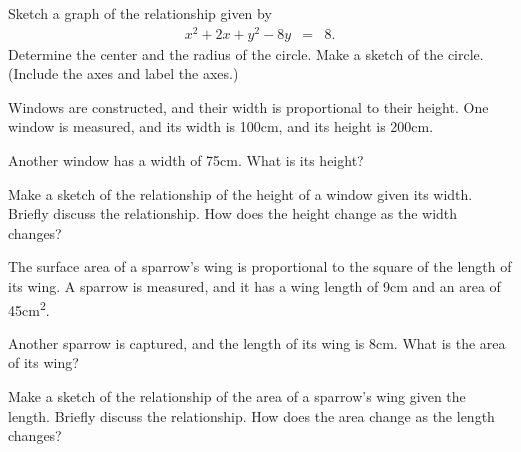 \begin{problem}
  \clearpage

\item Sketch a graph of the relationship given by
  \begin{eqnarray*}
    x^2 + 2x + y^2 - 8y & = & 8.
  \end{eqnarray*}
  Determine the center and the radius of the circle.  Make a sketch of
  the circle. (Include the axes and label the axes.)  

  \vfill

  \clearpage

\item Windows are constructed, and their width is proportional to
  their height. One window is measured, and its width is 100cm, and its
  height is 200cm. 

  \begin{subproblem}

  \item Another window has a width of 75cm. What is its height?

    \vfill

  \item Make a sketch of the relationship of the height of a window
    given its width. Briefly discuss the relationship. How does the
    height change as the width changes?  

    \vfill
    
  \end{subproblem}

  \clearpage

\item The surface area of a sparrow's wing is proportional to the
  square of the length of its wing. A sparrow is measured, and it has
  a wing length of 9cm and an area of 45cm\textsuperscript{2}. 

  \begin{subproblem}

  \item Another sparrow is captured, and the length of its wing is
    8cm. What is the area of its wing?

    \vfill

  \item Make a sketch of the relationship of the area of a sparrow's
    wing given the length. Briefly discuss the relationship. How does
    the area change as the length changes?  

    \vfill

  \end{subproblem}

  \vfill



\end{problem}

